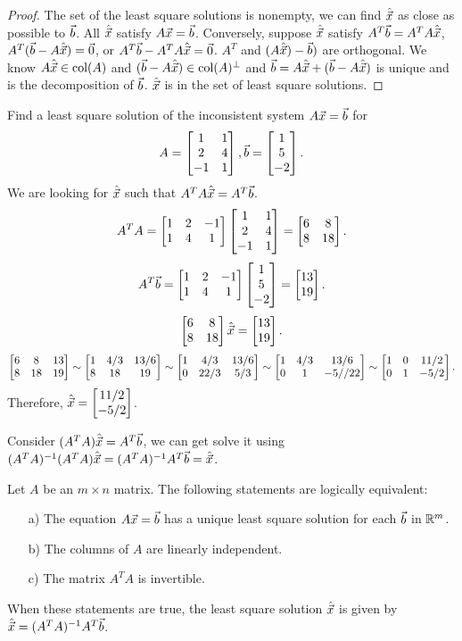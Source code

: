 \documentclass[10pt,a4paper]{article}
\begin{document}
\begin{proof}
	The set of the least square solutions is nonempty, we can find $\hat{\vec{x}}$ as close as possible to $\vec{b}$. All $\hat{\vec{x}}$ satisfy $A\vec{x} = \vec{b}$.
	Conversely, suppose $\hat{\vec{x}}$ satisfy $A^T\vec{b} = A^TA\hat{\vec{x}}$,  $A^T(\vec{b}-A\hat{\vec{x}}) = \vec{0}$, or $A^T\vec{b} - A^T A\hat{\vec{x}} = \vec{0}$. $A^T$ and $(A\hat{\vec{x}})-\vec{b})$ are orthogonal. We know $A\hat{\vec{x}}\in\text{col}(A)$ and $(\vec{b}-A\hat{\vec{x}})\in\text{col}(A)^\perp$ and $\vec{b} = A\hat{\vec{x}}+(\vec{b}-A\hat{\vec{x}})$ is unique and is the decomposition of $\vec{b}$. $\hat{\vec{x}}$ is in the set of least square solutions.
\end{proof}
\begin{example}
	Find a least square solution of the inconsistent system $A\vec{x} = \vec{b}$ for
	$$A = \begin{bmatrix}1&1\\2&4\\-1&1\end{bmatrix},\vec{b} = \begin{bmatrix}1\\5\\-2\end{bmatrix}.$$
	We are looking for $\hat{\vec{x}}$ such that $A^TA\hat{\vec{x}} = A^T\vec{b}$.
	$$A^TA = \begin{bmatrix}1&2&-1\\1&4&1\end{bmatrix}\begin{bmatrix}1&1\\2&4\\-1&1\end{bmatrix} = \begin{bmatrix}6&8\\8&18\end{bmatrix}.$$
	$$A^T\vec{b} = \begin{bmatrix}1&2&-1\\1&4&1\end{bmatrix}\begin{bmatrix}1\\5\\-2\end{bmatrix} = \begin{bmatrix}13\\19\end{bmatrix}.$$
	$$\begin{bmatrix}6&8\\8&18\end{bmatrix}\hat{\vec{x}} = \begin{bmatrix}13\\19\end{bmatrix}.$$
	$$\begin{bmatrix}6&8&13\\8&18&19\end{bmatrix} \sim \begin{bmatrix}1 & 4/3 & 13/6\\8&18&19\end{bmatrix} \sim \begin{bmatrix}1&4/3&13/6\\0&22/3&5/3\end{bmatrix}\sim \begin{bmatrix}1 & 4/3 & 13/6\\0& 1 & -5//22\end{bmatrix}\sim\begin{bmatrix}1&0& 11/2\\0&1& -5/2\end{bmatrix}.$$
	Therefore,  $\hat{\vec{x}} =  \begin{bmatrix}11/2\\-5/2\end{bmatrix}$.
	
	Consider $(A^TA)\hat{\vec{x}} = A^T\vec{b}$, we can get solve it using $(A^TA)^{-1}(A^TA)\hat{\vec{x}} = (A^TA)^{-1} A^T\vec{b} = \hat{\vec{x}}$.
\end{example}
\begin{theorem}
	Let $A$ be an $m\times n$ matrix. The following statements are logically equivalent:
	\begin{enumerate}
		\item[a)] The equation $A\vec{x}=\vec{b}$ has a unique least square solution for each $\vec{b}$ in $\mathbb{R}^m$.
		\item[b)] The columns of $A$ are linearly independent.
		\item[c)] The matrix $A^T A $ is invertible.
	\end{enumerate}
	When these statements are true, the least square solution $\hat{\vec{x}}$ is given by $\hat{\vec{x}} = (A^T A)^{-1} A^T\vec{b}$.
\end{theorem}
\end{document}
